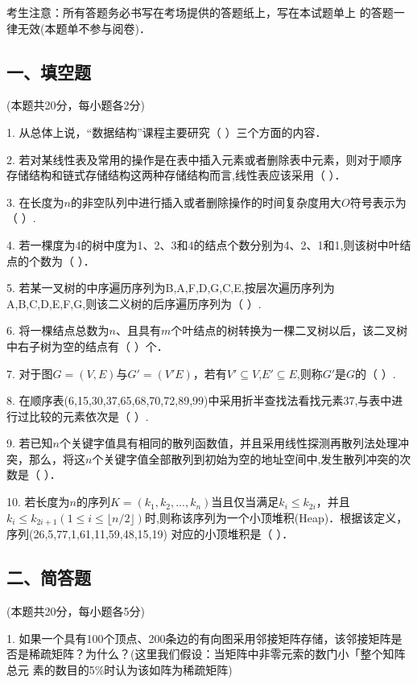

考生注意：所有答题务必书写在考场提供的答题纸上，写在本试题单上 的答题一律无效(本题单不参与阅卷)．

\subsection{一、填空题}
(本题共20分，每小题各2分)

1. 从总体上说，“数据结构”课程主要研究（    ）三个方面的内容．

2. 若对某线性表及常用的操作是在表中插入元素或者删除表中元素，则对于顺序存储结构和链式存储结构这两种存储结构而言,线性表应该采用（    ）．

3. 在长度为$n$的非空队列中进行插入或者删除操作的时间复杂度用大$O$符号表示为（    ）.

4. 若一棵度为4的树中度为1、2、3和4的结点个数分别为4、2、1和1,则该树中叶结点的个数为（    ）．

5. 若某一叉树的中序遍历序列为B,A,F,D,G,C,E,按层次遍历序列为A,B,C,D,E,F,G,则该二义树的后序遍历序列为（    ）.

6. 将一棵结点总数为$n$、且具有$m$个叶结点的树转换为一棵二叉树以后，该二叉树中右子树为空的结点有（    ）个．

7. 对于图$G=(V,E)$与$G'=(V'E)$，若有$V'\subseteq V$,$E'\subseteq E$,则称$G'$是$G$的（    ）.

8. 在顺序表(6,15,30,37,65,68,70,72,89,99)中采用折半查找法看找元素37,与表中进行过比较的元素依次是（    ）.

9. 若已知$n$个关键字值具有相同的散列函数值，并且采用线性探测再散列法处理冲突，那么，将这$n$个关键字值全部散列到初始为空的地址空间中,发生散列冲突的次数是（    ）．

10. 若长度为$n$的序列$K=(k_1,k_2,...,k_n)$当且仅当满足$k_i\leqslant k_{2i}$，并且$k_i\leqslant k_{2i+1} (1\leqslant i\leqslant \lfloor n/2 \rfloor)$时,则称该序列为一个小顶堆积(Heap)．根据该定义，序列(26,5,77,1,61,11,59,48,15,19) 对应的小顶堆积是（     ）．

\subsection{二、简答题}
(本题共20分，每小题各5分)

1. 如果一个具有100个顶点、200条边的有向图采用邻接矩阵存储，该邻接矩阵是 否是稀疏矩阵？为什么？(这里我们假设：当矩阵中非零元索的数门小「整个知阵总元 素的数目的5\%时认为该如阵为稀疏矩阵)

